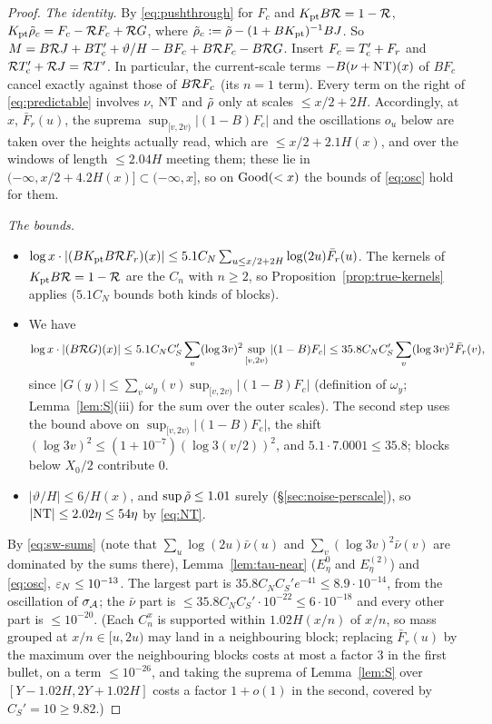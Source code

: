 \begin{proof}
\emph{The identity.} By \eqref{eq:pushthrough} for $F_c$ and $K_{\mathrm{pt}} B\mathcal{R}=1-\mathcal{R}$, $K_{\mathrm{pt}}\tilde\rho_c=F_c-\mathcal{R} F_c+\mathcal{R} G$, where
$\tilde\rho_c:=\tilde\rho-(1+BK_{\mathrm{pt}})^{-1}BJ$. So $M=B\mathcal{R} J+BT'_{\mathrm{c}}+\vartheta/H-BF_c+B\mathcal{R} F_c-B\mathcal{R} G$. Insert $F_c=T'_{\mathrm{c}}+F_r$ and
$\mathcal{R}T'_{\mathrm{c}}+\mathcal{R} J=\mathcal{R} T'$. In particular, the current-scale terms $-B(\nu+\mathrm{NT})(x)$ of $BF_c$ cancel exactly against those of
$B\mathcal{R} F_c$ (its $n=1$ term). Every term on the right of \eqref{eq:predictable} involves $\nu$, $\mathrm{NT}$ and $\tilde\rho$ only at scales
$\le x/2+2H$. Accordingly, at $x$, $\bar F_r(u)$, the suprema $\sup_{[v,2v)}|(1-B)F_c|$ and the oscillations $o_u$ below are taken over
the heights actually read, which are $\le x/2+2.1H(x)$, and over the windows of length $\le2.04H$ meeting them; these lie in
$(-\infty,x/2+4.2H(x)]\subset(-\infty,x]$, so on $\mathrm{Good}(<x)$ the bounds of \eqref{eq:osc} hold for them.

\emph{The bounds.}
\begin{itemize}
\item $\log x\cdot|(BK_{\mathrm{pt}} B\mathcal{R} F_r)(x)|\le5.1C_N\sum_{u\le x/2+2H}\log(2u)\bar F_r(u)$. The kernels of $K_{\mathrm{pt}} B\mathcal{R}=1-\mathcal{R}$
  are the $C_n$ with $n\ge2$, so Proposition~\ref{prop:true-kernels} applies ($5.1C_N$ bounds both kinds of blocks).
\item We have
  \[
    \log x\cdot|(B\mathcal{R} G)(x)|\le5.1C_NC_S'\sum_v(\log3v)^2\sup_{[v,2v)}|(1-B)F_c|\le35.8C_NC_S'\sum_v(\log3v)^2\bar F_r(v),
  \]
  since $|G(y)|\le\sum_v\omega_y(v)\sup_{[v,2v)}|(1-B)F_c|$ (definition of $\omega_y$; Lemma~\ref{lem:S}(iii) for the sum over
  the outer scales). The second step uses the bound above on $\sup_{[v,2v)}|(1-B)F_c|$, the shift
  $(\log3v)^2\le(1+10^{-7})(\log3(v/2))^2$, and $5.1\cdot7.0001\le35.8$; blocks below $X_0/2$ contribute $0$.
\item $|\vartheta/H|\le6/H(x)$, and $\sup\tilde\rho\le1.01$ surely (\S\ref{sec:noise-perscale}), so $|\mathrm{NT}|\le2.02\eta\le54\eta$ by
  \eqref{eq:NT}.
\end{itemize}
By \eqref{eq:sw-sums} (note that $\sum_u\log(2u)\bar\nu(u)$ and $\sum_v(\log 3v)^2\bar\nu(v)$ are dominated by the sums
there), Lemma~\ref{lem:tau-near} ($E_\eta^0$ and $E_\eta^{(2)}$) and \eqref{eq:osc}, $\varepsilon_N\le10^{-13}$. The largest part is
$35.8C_NC_S'e^{-41}\le8.9\cdot10^{-14}$, from the oscillation of $\sigma_{\mathcal{A}}$; the $\bar\nu$ part is $\le35.8C_NC_S'\cdot10^{-22}\le6\cdot10^{-18}$ and every
other part is $\le10^{-20}$. (Each $C_n^x$ is supported within $1.02H(x/n)$ of $x/n$, so mass grouped at $x/n\in[u,2u)$ may
land in a neighbouring block; replacing $\bar F_r(u)$ by the maximum over the neighbouring blocks costs at most a factor $3$
in the first bullet, on a term $\le10^{-26}$, and taking the suprema of Lemma~\ref{lem:S} over $[Y-1.02H,2Y+1.02H]$ costs a
factor $1+o(1)$ in the second, covered by $C_S'=10\ge9.82$.)
\end{proof}

